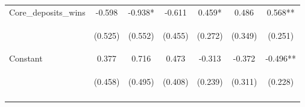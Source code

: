\begin{tabular}{lcccccc}
Core\_deposits\_wins & -0.598 & -0.938* & -0.611 & 0.459* & 0.486 & 0.568** \\
\vspace{4pt} & \begin{footnotesize}(0.525)\end{footnotesize} & \begin{footnotesize}(0.552)\end{footnotesize} & \begin{footnotesize}(0.455)\end{footnotesize} & \begin{footnotesize}(0.272)\end{footnotesize} & \begin{footnotesize}(0.349)\end{footnotesize} & \begin{footnotesize}(0.251)\end{footnotesize} \\
Constant & 0.377 & 0.716 & 0.473 & -0.313 & -0.372 & -0.496** \\
 & \begin{footnotesize}(0.458)\end{footnotesize} & \begin{footnotesize}(0.495)\end{footnotesize} & \begin{footnotesize}(0.408)\end{footnotesize} & \begin{footnotesize}(0.239)\end{footnotesize} & \begin{footnotesize}(0.311)\end{footnotesize} & \begin{footnotesize}(0.228)\end{footnotesize} \\
\vspace{4pt} & \begin{footnotesize}\end{footnotesize} & \begin{footnotesize}\end{footnotesize} & \begin{footnotesize}\end{footnotesize} & \begin{footnotesize}\end{footnotesize} & \begin{footnotesize}\end{footnotesize} & \begin{footnotesize}\end{footnotesize} \\

\end{tabular}
